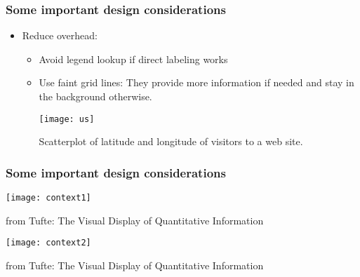 \documentclass{beamer}
\begin{document}
\begin{frame}
\frametitle{Some important design considerations}
\begin{itemize}
\item Reduce overhead: 
\begin{itemize}
\item Avoid legend lookup if direct labeling works
\item Use faint grid lines: They provide more information if
needed and stay in the background otherwise.
\smallskip

\begin{center}
\texttt{[image: us]}

Scatterplot of latitude and longitude of visitors to a web site.
\end{center}

\end{itemize}
\end{itemize}
\end{frame}

\begin{frame}
\frametitle{Some important design considerations}

\begin{center}
\texttt{[image: context1]}
\end{center}

from Tufte: The Visual Display of Quantitative Information
\end{frame}

\begin{frame}
\begin{center}
\texttt{[image: context2]}
\end{center}


from Tufte: The Visual Display of Quantitative Information
\end{frame}
\end{document}
